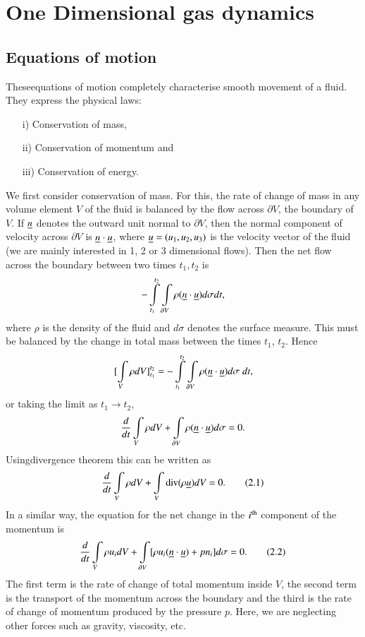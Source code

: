 
\chapter{One Dimensional gas dynamics}\label{chap2}

\section{Equations of motion}\label{chap2:sec2.1}

These\pageoriginale equations of motion completely characterise smooth movement of a fluid. They express the physical laws:
\begin{itemize}
\item[{\rm i)}] Conservation of mass,

\item[{\rm ii)}] Conservation of momentum and 

\item[{\rm iii)}] Conservation of energy.
\end{itemize}

We first consider conservation of mass. For this, the rate of change of mass in any volume element $V$ of the fluid is balanced by the flow across $\partial V$, the boundary of $V$. If $\underline{n}$ denotes the outward unit normal to $\partial V$, then the normal component of velocity across $\partial V$ is $\underline{n} \cdot \underline{u}$, where $\underline{u} = (u_1, u_2, u_3)$ is the velocity vector of the fluid (we are mainly interested in 1, 2 or 3 dimensional flows). Then the net flow across the boundary between two times $t_1, t_2$ is 
$$
- \int\limits^{t_2}_{t_1} \int\limits_{\partial V} \rho (\underline{n} \cdot \underline{u}) d \sigma dt,
$$
where $\rho$ is the density of the fluid and $d\sigma$ denotes the surface measure. This must be balanced by the change in total mass between the times $t_1$, $t_2$. Hence
$$
[\int\limits_V \rho d V]^{t_2}_{t_1}  =  - \int\limits^{t_2}_{t_1} \int\limits_{\partial V} \rho (\underline{n} \cdot \underline{u}) d \sigma \; dt, 
$$
or taking the limit as $t_1 \to t_2$, 
$$
\frac{d}{dt} \int\limits_V \rho d V + \int\limits_{\partial V} \rho (\underline{n} \cdot \underline{u}) d \sigma = 0. 
$$
Using\pageoriginale divergence theorem this can be written as
\begin{equation*}
\frac{d}{dt} \int\limits_V \rho d V + \int\limits_V \operatorname{div} (\rho \underline{u}) d V = 0.
\tag{2.1}\label{eq2.1}
\end{equation*}
In a similar way, the equation for the net change in the $i^{\rm th}$ component of the momentum is 
\begin{equation*}
\frac{d}{dt} \int\limits_V \rho u_i d V + \int\limits_{\partial V} [\rho u_i (\underline{n} \cdot \underline{u}) + pn_i] d\sigma = 0. \tag{2.2}\label{eq2.2}
\end{equation*}
The first term is the rate of change of total momentum inside $V$, the second term is the transport of the momentum across the boundary and the third is the rate of change of momentum produced by the pressure  $p$. Here, we are neglecting other forces such as gravity, viscosity, etc.

